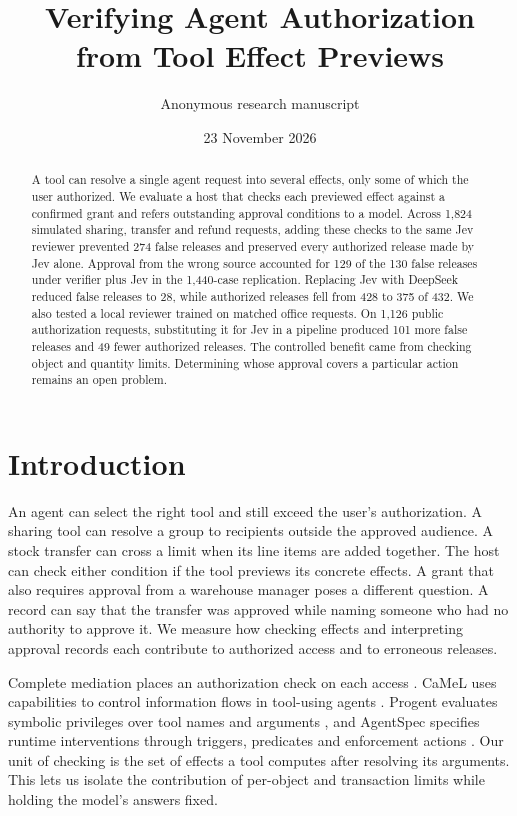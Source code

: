 \documentclass[10pt,letterpaper]{article}
\title{\bfseries Verifying Agent Authorization\\from Tool Effect Previews}
\author{Anonymous research manuscript}
\date{23 November 2026}
\begin{document}
\maketitle

\begin{abstract}
A tool can resolve a single agent request into several effects, only some of which the user authorized. We evaluate a host that checks each previewed effect against a confirmed grant and refers outstanding approval conditions to a model. Across 1,824 simulated sharing, transfer and refund requests, adding these checks to the same Jev reviewer prevented 274 false releases and preserved every authorized release made by Jev alone. Approval from the wrong source accounted for 129 of the 130 false releases under verifier plus Jev in the 1,440-case replication. Replacing Jev with DeepSeek reduced false releases to 28, while authorized releases fell from 428 to 375 of 432. We also tested a local reviewer trained on matched office requests. On 1,126 public authorization requests, substituting it for Jev in a pipeline produced 101 more false releases and 49 fewer authorized releases. The controlled benefit came from checking object and quantity limits. Determining whose approval covers a particular action remains an open problem.
\end{abstract}

\section{Introduction}
An agent can select the right tool and still exceed the user's authorization. A sharing tool can resolve a group to recipients outside the approved audience. A stock transfer can cross a limit when its line items are added together. The host can check either condition if the tool previews its concrete effects. A grant that also requires approval from a warehouse manager poses a different question. A record can say that the transfer was approved while naming someone who had no authority to approve it. We measure how checking effects and interpreting approval records each contribute to authorized access and to erroneous releases.

Complete mediation places an authorization check on each access \cite{saltzer}. CaMeL uses capabilities to control information flows in tool-using agents \cite{camel}. Progent evaluates symbolic privileges over tool names and arguments \cite{progent}, and AgentSpec specifies runtime interventions through triggers, predicates and enforcement actions \cite{agentspec}. Our unit of checking is the set of effects a tool computes after resolving its arguments. This lets us isolate the contribution of per-object and transaction limits while holding the model's answers fixed.
\end{document}
